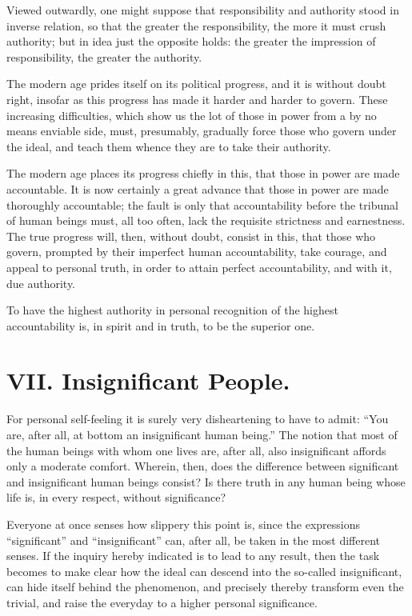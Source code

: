 \documentclass[12pt,a4paper]{book}
\begin{document}
Viewed outwardly, one might suppose that responsibility and authority stood in inverse relation, so that the greater the responsibility, the more it must crush authority; but in idea just the opposite holds: the greater the impression of responsibility, the greater the authority.

The modern age prides itself on its political progress, and it is without doubt right, insofar as this progress has made it harder and harder to govern. These increasing difficulties, which show us the lot of those in power from a by no means enviable side, must, presumably, gradually force those who govern under the ideal, and teach them whence they are to take their authority.

The modern age places its progress chiefly in this, that those in power are made accountable. It is now certainly a great advance that those in power are made thoroughly accountable; the fault is only that accountability before the tribunal of human beings must, all too often, lack the requisite strictness and earnestness. The true progress will, then, without doubt, consist in this, that those who govern, prompted by their imperfect human
accountability, take courage, and appeal to personal truth, in order to attain perfect accountability, and with it, due authority.

To have the highest authority in personal recognition of the highest accountability is, in spirit and in truth, to be the superior one.

\chapter*{VII. Insignificant People.}
\label{ch:forel7}

For personal self-feeling it is surely very disheartening to have to admit: ``You are, after all, at bottom an insignificant human being.'' The notion that most of the human beings with whom one lives are, after all, also insignificant affords only a moderate comfort. Wherein, then, does the difference between significant and insignificant human beings consist? Is there truth in any human being whose life is, in every respect, without significance?

Everyone at once senses how slippery this point is, since the expressions ``significant'' and ``insignificant'' can, after all, be taken in the most different senses. If the inquiry hereby indicated is to lead to any result, then the task becomes to make clear how the ideal can descend into the so-called insignificant, can hide itself behind the phenomenon, and precisely thereby transform even the trivial, and raise the everyday to a higher personal significance.
\end{document}
